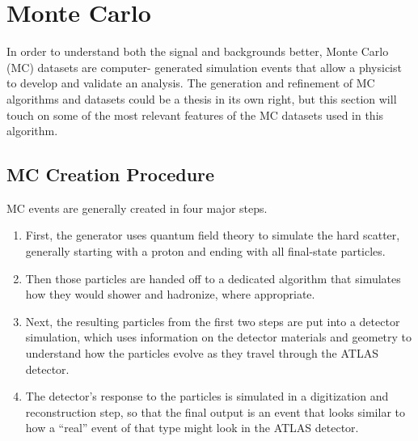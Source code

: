  

\chapter[Monte Carlo]{Monte Carlo}

In order to understand both the signal and backgrounds better, Monte Carlo (MC) datasets are computer-
generated simulation events that allow a physicist to develop and validate an analysis.  The generation and refinement of MC 
algorithms and datasets could be a thesis in its own right, but this section will touch on some of 
the most relevant features of the MC datasets used in this algorithm.


\section{MC Creation Procedure}
\label{sec:mc-gen-overview}
MC events are generally created in four major steps.  
\begin{enumerate}
    \item First, the generator uses quantum field theory to simulate the hard 
    scatter, generally starting with a proton and ending with all final-state particles.  
    \item Then those particles are handed off to a dedicated algorithm that simulates 
    how they would shower and hadronize, where appropriate.  
    \item Next, the resulting particles from the first two steps are put 
    into a detector simulation, which uses information on the detector materials and geometry 
    to understand how the particles evolve as they travel through the ATLAS detector.  
    \item The detector's response to the particles is simulated in a 
    digitization and reconstruction step, so that the final output is an event that 
    looks similar to how a ``real'' event of that type might look in the ATLAS detector. 
\end{enumerate} 

